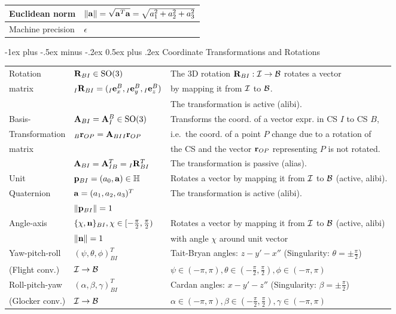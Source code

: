 \documentclass[10pt,landscape,a4paper]{article}
\makeatletter
\renewcommand{\section}{\@startsection{section}{1}{0mm}%
                                {-1ex plus -.5ex minus -.2ex}%
                                {0.5ex plus .2ex}%
                                {\normalfont\large\bfseries}}
\makeatother
\begin{document}
\begin{multicols}{2}
\begin{tabular}{|l|l|l|}
Euclidean norm & \multicolumn{2}{l|}{$\lVert \mathbf a \rVert = \sqrt{\mathbf a^T\mathbf a} = \sqrt{a_1^2 + a_2^2 + a_3^2}$} \\ \hline
Machine precision & $\epsilon$ & \\ \hline
\end{tabular}

\section{Coordinate Transformations and Rotations}
\begin{tabular}{|l|l@{}|l@{}|}
\hline
Rotation  & $\mathbf R_{BI} \in \mathrm{SO}(3)$ & The 3D rotation $\mathbf R_{BI}:\mathcal{I} \rightarrow \mathcal{B}$ rotates a vector \\ 
matrix & ${}_I\mathbf R_{BI} = ({}_I\mathbf e_x^B, {}_I\mathbf e_y^B, {}_I\mathbf e_z^B)$ & by mapping it from $\mathcal{I}$ to $\mathcal{B}$. \\
& & The transformation is active (alibi).\\ \hline
Basis-& $\mathbf A_{BI} = \mathbf A_{I}^{B}\in \mathrm{SO}(3)$ & Transforms the coord. of a vector expr. in CS $I$ to CS $B$,\\  
Transformation  & ${}_{B}\mathbf r_{OP} = \mathbf A_{BI} {}_{I}\mathbf r_{OP}$ &  i.e.\ the coord. of a point $P$ change due to a rotation of \\
matrix& &  the CS and the vector $\mathbf r_{OP}$ representing $P$ is not rotated. \\  
 & $\mathbf A_{BI} = \mathbf A_{IB}^T = {}_I \mathbf R_{BI}^T$ & The transformation is passive (alias).\\ \hline
 Unit  & $\mathbf p_{BI}=(a_0, \mathbf a)\in \mathbb{H}$ &  Rotates a vector by mapping it from $\mathcal{I}$ to $\mathcal{B}$ (active, alibi). \\
Quaternion& $\mathbf a = (a_1, a_2 ,a_3)^T$  & The transformation is active (alibi). \\ 
 & $\left\lVert\mathbf p_{BI}\right\rVert=1$  &   \\ \hline
Angle-axis & $\{\chi, \mathbf n\}_{BI}, \chi \in [-\frac{\pi}{2}, \frac{\pi}{2})$ & Rotates a vector by mapping it from $\mathcal{I}$ to $\mathcal{B}$  (active, alibi) \\
& $\lVert\mathbf n\rVert=1$ & with angle $\chi$ around unit vector \\ \hline
Yaw-pitch-roll &  $(\psi, \theta, \phi)_{BI}^T$  & Tait-Bryan angles: $z-y'-x''$ (Singularity: $\theta=\pm\frac{\pi}{2}$) \\
 (Flight conv.) & $\mathcal{I} \rightarrow \mathcal{B}$ & $\psi\in(-\pi,\pi), \theta\in(-\frac{\pi}{2},\frac{\pi}{2}), \phi\in(-\pi,\pi)$  \\  \hline
Roll-pitch-yaw &  $(\alpha, \beta, \gamma)_{BI}^T$ & Cardan angles: $x-y'-z''$ (Singularity: $\beta=\pm\frac{\pi}{2}$)  \\
 (Glocker conv.)& $\mathcal{I} \rightarrow \mathcal{B}$ & $\alpha\in(-\pi,\pi), \beta\in(-\frac{\pi}{2},\frac{\pi}{2}), \gamma\in(-\pi,\pi)$  \\  \hline
\end{tabular} %

\end{multicols}
\end{document}
